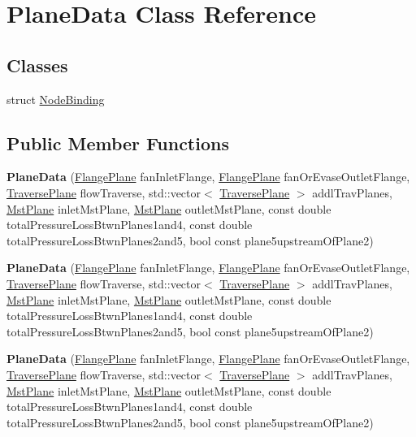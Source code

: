\hypertarget{class_plane_data}{}\section{Plane\+Data Class Reference}
\label{class_plane_data}
\subsection*{Classes}
\begin{DoxyCompactItemize}
\item 
struct \hyperlink{struct_plane_data_1_1_node_binding}{Node\+Binding}
\end{DoxyCompactItemize}
\subsection*{Public Member Functions}
\begin{DoxyCompactItemize}
\item 
\mbox{\label{class_plane_data_a1ad5393fae6978e34f15d315b03f5525}} 
{\bfseries Plane\+Data} (\hyperlink{class_flange_plane}{Flange\+Plane} fan\+Inlet\+Flange, \hyperlink{class_flange_plane}{Flange\+Plane} fan\+Or\+Evase\+Outlet\+Flange, \hyperlink{class_traverse_plane}{Traverse\+Plane} flow\+Traverse, std\+::vector$<$ \hyperlink{class_traverse_plane}{Traverse\+Plane} $>$ addl\+Trav\+Planes, \hyperlink{class_mst_plane}{Mst\+Plane} inlet\+Mst\+Plane, \hyperlink{class_mst_plane}{Mst\+Plane} outlet\+Mst\+Plane, const double total\+Pressure\+Loss\+Btwn\+Planes1and4, const double total\+Pressure\+Loss\+Btwn\+Planes2and5, bool const plane5upstream\+Of\+Plane2)
\item 
\mbox{\label{class_plane_data_a1ad5393fae6978e34f15d315b03f5525}} 
{\bfseries Plane\+Data} (\hyperlink{class_flange_plane}{Flange\+Plane} fan\+Inlet\+Flange, \hyperlink{class_flange_plane}{Flange\+Plane} fan\+Or\+Evase\+Outlet\+Flange, \hyperlink{class_traverse_plane}{Traverse\+Plane} flow\+Traverse, std\+::vector$<$ \hyperlink{class_traverse_plane}{Traverse\+Plane} $>$ addl\+Trav\+Planes, \hyperlink{class_mst_plane}{Mst\+Plane} inlet\+Mst\+Plane, \hyperlink{class_mst_plane}{Mst\+Plane} outlet\+Mst\+Plane, const double total\+Pressure\+Loss\+Btwn\+Planes1and4, const double total\+Pressure\+Loss\+Btwn\+Planes2and5, bool const plane5upstream\+Of\+Plane2)
\item 
\mbox{\label{class_plane_data_a1ad5393fae6978e34f15d315b03f5525}} 
{\bfseries Plane\+Data} (\hyperlink{class_flange_plane}{Flange\+Plane} fan\+Inlet\+Flange, \hyperlink{class_flange_plane}{Flange\+Plane} fan\+Or\+Evase\+Outlet\+Flange, \hyperlink{class_traverse_plane}{Traverse\+Plane} flow\+Traverse, std\+::vector$<$ \hyperlink{class_traverse_plane}{Traverse\+Plane} $>$ addl\+Trav\+Planes, \hyperlink{class_mst_plane}{Mst\+Plane} inlet\+Mst\+Plane, \hyperlink{class_mst_plane}{Mst\+Plane} outlet\+Mst\+Plane, const double total\+Pressure\+Loss\+Btwn\+Planes1and4, const double total\+Pressure\+Loss\+Btwn\+Planes2and5, bool const plane5upstream\+Of\+Plane2)
\end{DoxyCompactItemize}
